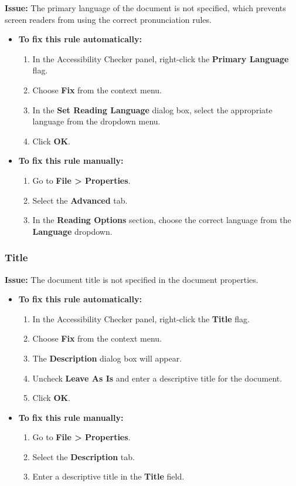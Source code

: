 \textbf{Issue:} The primary language of the document is not specified, which prevents screen readers from using the correct pronunciation rules.

\begin{itemize}
	\item \textbf{To fix this rule automatically:}
	      \begin{enumerate}
		      \item In the Accessibility Checker panel, right-click the \textbf{Primary Language} flag.
		      \item Choose \textbf{Fix} from the context menu.
		      \item In the \textbf{Set Reading Language} dialog box, select the appropriate language from the dropdown menu.
		      \item Click \textbf{OK}.
	      \end{enumerate}
	\item \textbf{To fix this rule manually:}
	      \begin{enumerate}
		      \item Go to \textbf{File > Properties}.
		      \item Select the \textbf{Advanced} tab.
		      \item In the \textbf{Reading Options} section, choose the correct language from the \textbf{Language} dropdown.
	      \end{enumerate}
\end{itemize}

\subsubsection{Title}
\label{ssubsec:pdf-title}

\textbf{Issue:} The document title is not specified in the document properties.

\begin{itemize}
	\item \textbf{To fix this rule automatically:}
	      \begin{enumerate}
		      \item In the Accessibility Checker panel, right-click the \textbf{Title} flag.
		      \item Choose \textbf{Fix} from the context menu.
		      \item The \textbf{Description} dialog box will appear.
		      \item Uncheck \textbf{Leave As Is} and enter a descriptive title for the document.
		      \item Click \textbf{OK}.
	      \end{enumerate}
	\item \textbf{To fix this rule manually:}
	      \begin{enumerate}
		      \item Go to \textbf{File > Properties}.
		      \item Select the \textbf{Description} tab.
		      \item Enter a descriptive title in the \textbf{Title} field.
	      \end{enumerate}
\end{itemize}


